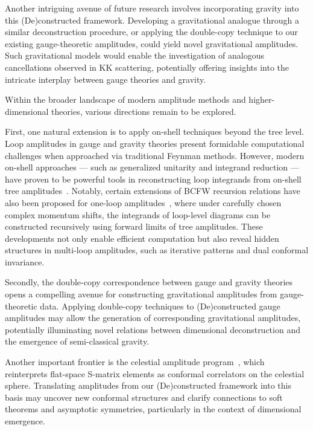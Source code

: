 \documentclass[12pt]{article}
\numberwithin{equation}{section}
\begin{document}
Another intriguing avenue of future research involves incorporating gravity into this (De)constructed framework. Developing a gravitational analogue through a similar deconstruction procedure, or applying the double-copy technique to our existing gauge-theoretic amplitudes, could yield novel gravitational amplitudes. Such gravitational models would enable the investigation of analogous cancellations observed in KK scattering, potentially offering insights into the intricate interplay between gauge theories and gravity.

Within the broader landscape of modern amplitude methods and higher-dimensional theories, various directions remain to be explored.

First, one natural extension is to apply on-shell techniques beyond the tree level. Loop amplitudes in gauge and gravity theories present formidable computational challenges when approached via traditional Feynman methods. However, modern on-shell approaches — such as generalized unitarity and integrand reduction — have proven to be powerful tools in reconstructing loop integrands from on-shell tree amplitudes~\cite{Bern:1994zx}. Notably, certain extensions of BCFW recursion relations have also been proposed for one-loop amplitudes~\cite{Kharel:2011vz}, where under carefully chosen complex momentum shifts, the integrands of loop-level diagrams can be constructed recursively using forward limits of tree amplitudes. These developments not only enable efficient computation but also reveal hidden structures in multi-loop amplitudes, such as iterative patterns and dual conformal invariance.


Secondly, the double-copy correspondence between gauge and gravity theories~\cite{Bern:2010ue} opens a compelling avenue for constructing gravitational amplitudes from gauge-theoretic data. Applying double-copy techniques to (De)constructed gauge amplitudes may allow the generation of corresponding gravitational amplitudes, potentially illuminating novel relations between dimensional deconstruction and the emergence of semi-classical gravity.

Another important frontier is the celestial amplitude program~\cite{Pasterski:2017kqt}, which reinterprets flat-space S-matrix elements as conformal correlators on the celestial sphere. Translating amplitudes from our (De)constructed framework into this basis may uncover new conformal structures and clarify connections to soft theorems and asymptotic symmetries, particularly in the context of dimensional emergence.
\end{document}
